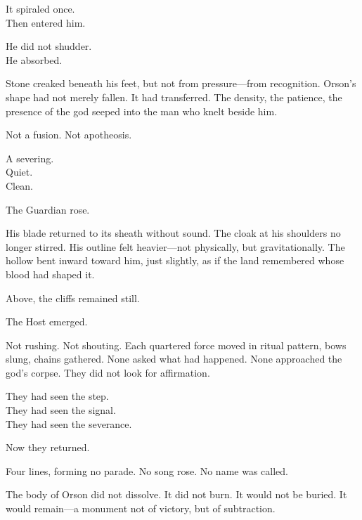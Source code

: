 \documentclass[9pt]{article}
\begin{document}
\vspace{0.5em}
It spiraled once.\\
Then entered him.

\vspace{0.5em}
He did not shudder.\\
He absorbed.

\vspace{0.5em}
Stone creaked beneath his feet, but not from pressure---from recognition. Orson’s shape had not merely fallen. It had transferred. The density, the patience, the presence of the god seeped into the man who knelt beside him.

\vspace{0.5em}
Not a fusion. Not apotheosis.

\vspace{0.5em}
A severing.\\
Quiet.\\
Clean.

\vspace{0.5em}
The Guardian rose.

\vspace{0.5em}
His blade returned to its sheath without sound. The cloak at his shoulders no longer stirred. His outline felt heavier---not physically, but gravitationally. The hollow bent inward toward him, just slightly, as if the land remembered whose blood had shaped it.

\vspace{0.5em}
Above, the cliffs remained still.

\vspace{0.5em}
The Host emerged.

\vspace{0.5em}
Not rushing. Not shouting. Each quartered force moved in ritual pattern, bows slung, chains gathered. None asked what had happened. None approached the god’s corpse. They did not look for affirmation.

\vspace{0.5em}
They had seen the step.\\
They had seen the signal.\\
They had seen the severance.

\vspace{0.5em}
Now they returned.

\vspace{0.5em}
Four lines, forming no parade. No song rose. No name was called.

\vspace{0.5em}
The body of Orson did not dissolve. It did not burn. It would not be buried. It would remain---a monument not of victory, but of subtraction.
\end{document}
